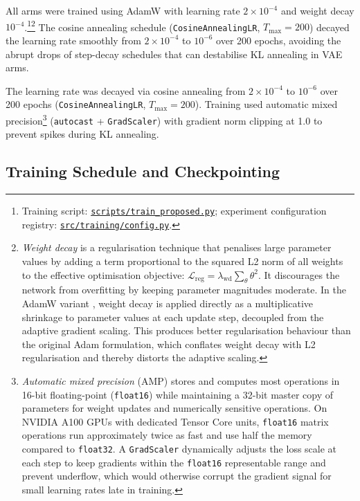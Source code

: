 \documentclass[12pt, a4paper, twoside, openright]{book}
\begin{document}
All arms were trained using AdamW \cite{loshchilov_decoupled_2019} with learning rate $2\times10^{-4}$ and weight decay $10^{-4}$.\footnote{Training script: \href{https://github.com/teklesam/ppva_hformer_codebase/blob/main/scripts/train_proposed.py}{\texttt{scripts/train\_proposed.py}}; experiment configuration registry: \href{https://github.com/teklesam/ppva_hformer_codebase/blob/main/src/training/config.py}{\texttt{src/training/config.py}}.}\footnote{\emph{Weight decay} is a regularisation technique that penalises large parameter values by adding a term proportional to the squared L2 norm of all weights to the effective optimisation objective: $\mathcal{L}_{\mathrm{reg}} = \lambda_{\mathrm{wd}}\sum_\theta \theta^2$. It discourages the network from overfitting by keeping parameter magnitudes moderate. In the AdamW variant \cite{loshchilov_decoupled_2019}, weight decay is applied directly as a multiplicative shrinkage to parameter values at each update step, decoupled from the adaptive gradient scaling. This produces better regularisation behaviour than the original Adam formulation, which conflates weight decay with L2 regularisation and thereby distorts the adaptive scaling.} The cosine annealing schedule (\texttt{CosineAnnealingLR}, $T_{\max}=200$) decayed the learning rate smoothly from $2\times10^{-4}$ to $10^{-6}$ over 200 epochs, avoiding the abrupt drops of step-decay schedules that can destabilise KL annealing in VAE arms.

The learning rate was decayed via cosine annealing from $2\times10^{-4}$ to $10^{-6}$ over 200 epochs (\texttt{CosineAnnealingLR}, $T_{\max}=200$). Training used automatic mixed precision\footnote{\emph{Automatic mixed precision} (AMP) \cite{micikevicius_mixed_2018} stores and computes most operations in 16-bit floating-point (\texttt{float16}) while maintaining a 32-bit master copy of parameters for weight updates and numerically sensitive operations. On NVIDIA A100 GPUs with dedicated Tensor Core units, \texttt{float16} matrix operations run approximately twice as fast and use half the memory compared to \texttt{float32}. A \texttt{GradScaler} dynamically adjusts the loss scale at each step to keep gradients within the \texttt{float16} representable range and prevent underflow, which would otherwise corrupt the gradient signal for small learning rates late in training.} (\texttt{autocast} + \texttt{GradScaler}) with gradient norm clipping at 1.0 to prevent spikes during KL annealing.

\subsection{Training Schedule and Checkpointing}
\label{sec:methods:training:schedule}
\end{document}
